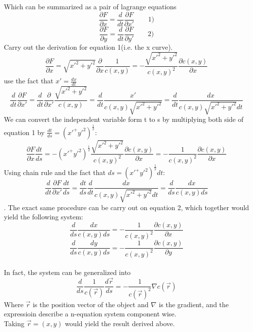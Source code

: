 \documentclass[%
 preprint,
 amsmath,amssymb,
 aps,
 pra,
 fleqn,
]{revtex4-2}
\begin{document}
Which can be summarized as a pair of lagrange equations
$$\frac{\partial F}{\partial x} = \frac{d}{d t}\frac{\partial F}{\partial x'} \qquad 1)$$
$$\frac{\partial F}{\partial y} = \frac{d}{d t}\frac{\partial F}{\partial y'}\qquad 2)$$
Carry out the derivation for equation 1(i.e. the x curve).
$$\frac{\partial F}{\partial x} = \sqrt{x'^2+y'^2}\frac{\partial}{\partial x}\frac{1}{c(x,y)} = -\frac{\sqrt{x'^2+y'^2}}{c(x,y)^2}\frac{\partial c(x,y)}{\partial x}$$
use the fact that $x' = \frac{dx}{dt}$
$$\frac{d}{d t} \frac{\partial F}{\partial x'} = \frac{d}{dt} \frac{\partial}{\partial x'}\frac{\sqrt{x'^2+y'^2}}{c(x,y)} = \frac{d}{dt} \frac{x'}{c(x,y)\sqrt{x'^2+y'^2}} = \frac{d}{dt} \frac{dx}{c(x,y)\sqrt{x'^2+y'^2}dt}$$
We can convert the independent variable form t to s by multiplying both side of equation 1 by $\frac{dt}{ds} = (x'^+y'^2)^{\frac{1}{2}}$:
$$\frac{\partial F}{\partial x}\frac{dt}{ds} = -(x'^+y'^2)^{\frac{1}{2}}\frac{\sqrt{x'^2+y'^2}}{c(x,y)^2}\frac{\partial c(x,y)}{\partial x} = -\frac{1}{c(x,y)^2}\frac{\partial c(x,y)}{\partial x}$$
Using chain rule and the fact that $ds = (x'^+y'^2)^{\frac{1}{2}} dt$:
$$\frac{d}{d t} \frac{\partial F}{\partial x'} \frac{dt}{ds} = \frac{dt}{ds}\frac{d}{dt} \frac{dx}{c(x,y)\sqrt{x'^2+y'^2}dt} = \frac{d}{ds}\frac{dx}{c(x,y)ds}$$.
The exact same procedure can be carry out on equation 2, which together would yield the following system:
$$\frac{d}{ds}\frac{dx}{c(x,y)ds} = -\frac{1}{c(x,y)^2}\frac{\partial c(x,y)}{\partial x}$$
$$\frac{d}{ds}\frac{dy}{c(x,y)ds} = -\frac{1}{c(x,y)^2}\frac{\partial c(x,y)}{\partial y}$$
\\
In fact, the system can be generalized into
$$\frac{d}{ds} \frac{1}{c(\vec{r})}\frac{d\vec{r}}{ds} = -\frac{1}{c(\vec{r})^2}\nabla c(\vec{r})$$
Where $\vec{r}$ is the position vector of the object and $\nabla$ is the gradient, and the expressioin describe a n-equation system component wise.\\
Taking $\vec{r} = (x,y)$ would yield the result derived above.
\end{document}
